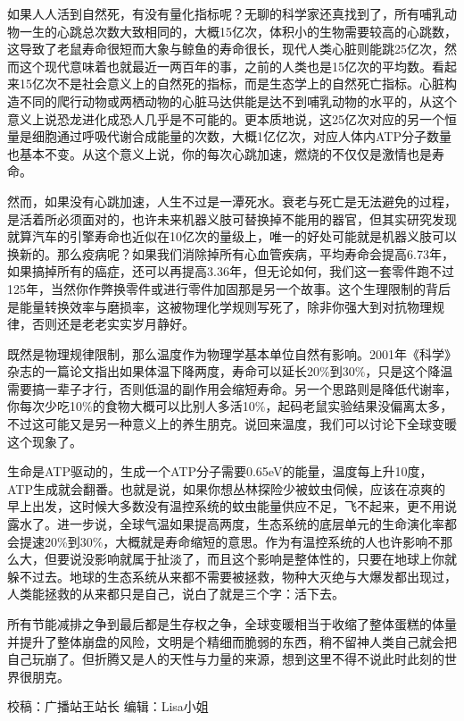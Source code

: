 \documentclass[]{book}
\begin{document}
如果人人活到自然死，有没有量化指标呢？无聊的科学家还真找到了，所有哺乳动物一生的心跳总次数大致相同的，大概15亿次，体积小的生物需要较高的心跳数，这导致了老鼠寿命很短而大象与鲸鱼的寿命很长，现代人类心脏则能跳25亿次，然而这个现代意味着也就最近一两百年的事，之前的人类也是15亿次的平均数。看起来15亿次不是社会意义上的自然死的指标，而是生态学上的自然死亡指标。心脏构造不同的爬行动物或两栖动物的心脏马达供能是达不到哺乳动物的水平的，从这个意义上说恐龙进化成恐人几乎是不可能的。更本质地说，这25亿次对应的另一个恒量是细胞通过呼吸代谢合成能量的次数，大概1亿亿次，对应人体内ATP分子数量也基本不变。从这个意义上说，你的每次心跳加速，燃烧的不仅仅是激情也是寿命。

然而，如果没有心跳加速，人生不过是一潭死水。衰老与死亡是无法避免的过程，是活着所必须面对的，也许未来机器义肢可替换掉不能用的器官，但其实研究发现就算汽车的引擎寿命也近似在10亿次的量级上，唯一的好处可能就是机器义肢可以换新的。那么疫病呢？如果我们消除掉所有心血管疾病，平均寿命会提高6.73年，如果搞掉所有的癌症，还可以再提高3.36年，但无论如何，我们这一套零件跑不过125年，当然你作弊换零件或进行零件加固那是另一个故事。这个生理限制的背后是能量转换效率与磨损率，这被物理化学规则写死了，除非你强大到对抗物理规律，否则还是老老实实岁月静好。

既然是物理规律限制，那么温度作为物理学基本单位自然有影响。2001年《科学》杂志的一篇论文指出如果体温下降两度，寿命可以延长20\%到30\%，只是这个降温需要搞一辈子才行，否则低温的副作用会缩短寿命。另一个思路则是降低代谢率，你每次少吃10\%的食物大概可以比别人多活10\%，起码老鼠实验结果没偏离太多，不过这可能又是另一种意义上的养生朋克。说回来温度，我们可以讨论下全球变暖这个现象了。

生命是ATP驱动的，生成一个ATP分子需要0.65eV的能量，温度每上升10度，ATP生成就会翻番。也就是说，如果你想丛林探险少被蚊虫伺候，应该在凉爽的早上出发，这时候大多数没有温控系统的蚊虫能量供应不足，飞不起来，更不用说露水了。进一步说，全球气温如果提高两度，生态系统的底层单元的生命演化率都会提速20\%到30\%，大概就是寿命缩短的意思。作为有温控系统的人也许影响不那么大，但要说没影响就属于扯淡了，而且这个影响是整体性的，只要在地球上你就躲不过去。地球的生态系统从来都不需要被拯救，物种大灭绝与大爆发都出现过，人类能拯救的从来都只是自己，说白了就是三个字：活下去。

所有节能减排之争到最后都是生存权之争，全球变暖相当于收缩了整体蛋糕的体量并提升了整体崩盘的风险，文明是个精细而脆弱的东西，稍不留神人类自己就会把自己玩崩了。但折腾又是人的天性与力量的来源，想到这里不得不说此时此刻的世界很朋克。

校稿：广播站王站长
编辑：Lisa小姐
\end{document}
